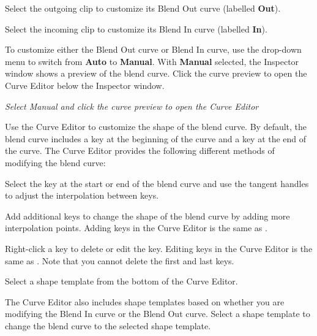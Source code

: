 \begin{DoxyEnumerate}
\item Select the outgoing clip to customize its Blend Out curve (labelled {\bfseries{Out}}).
\item Select the incoming clip to customize its Blend In curve (labelled {\bfseries{In}}).
\end{DoxyEnumerate}

To customize either the Blend Out curve or Blend In curve, use the drop-\/down menu to switch from {\bfseries{Auto}} to {\bfseries{Manual}}. With {\bfseries{Manual}} selected, the Inspector window shows a preview of the blend curve. Click the curve preview to open the Curve Editor below the Inspector window.



{\itshape Select Manual and click the curve preview to open the Curve Editor}

Use the Curve Editor to customize the shape of the blend curve. By default, the blend curve includes a key at the beginning of the curve and a key at the end of the curve. The Curve Editor provides the following different methods of modifying the blend curve\+:


\begin{DoxyItemize}
\item Select the key at the start or end of the blend curve and use the tangent handles to adjust the interpolation between keys.
\item Add additional keys to change the shape of the blend curve by adding more interpolation points. Adding keys in the Curve Editor is the same as .
\item Right-\/click a key to delete or edit the key. Editing keys in the Curve Editor is the same as . Note that you cannot delete the first and last keys.
\item Select a shape template from the bottom of the Curve Editor.
\end{DoxyItemize}

The Curve Editor also includes shape templates based on whether you are modifying the Blend In curve or the Blend Out curve. Select a shape template to change the blend curve to the selected shape template. 